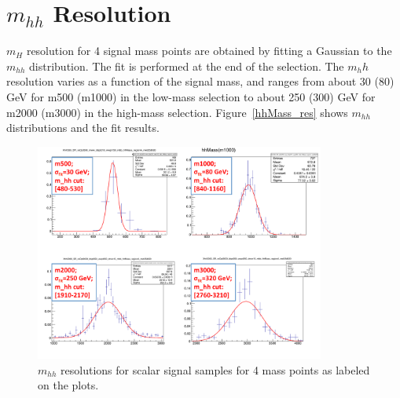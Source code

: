 \section {$m_{hh}$ Resolution}

$m_{H}$ resolution for 4 signal mass points are obtained by fitting a Gaussian to the $m_{hh}$ distribution. The fit is performed at the end of the selection. The $m_h{h}$ resolution varies as a function of the signal mass, and ranges from about 30 (80) GeV for m500 (m1000) in the low-mass selection to about 250 (300) GeV for m2000 (m3000) in the high-mass selection.
Figure~\ref{hhMass_res} shows  $m_{hh}$ distributions and the fit results. 

\begin{figure}[!h]
\begin{center}
\includegraphics*[width=0.85\textwidth] {figures/4Scalars_GausFit_Resolution_hhMass.pdf}
\caption[ $m_{hh}$ resolution]{$m_{hh}$ resolutions for scalar signal samples for 4 mass points as labeled on the plots.}
\label{fig:hhMass_res}
\end{center}
\end{figure}
